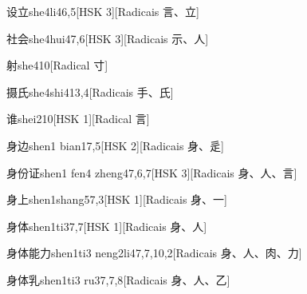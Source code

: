 \begin{entry}{设立}{she4li4}{6,5}[HSK 3][Radicais ⾔、⽴]
\end{entry}

\begin{entry}{社会}{she4hui4}{7,6}[HSK 3][Radicais ⽰、⼈]
\end{entry}

\begin{entry}{射}{she4}{10}[Radical ⼨]
\end{entry}

\begin{entry}{摄氏}{she4shi4}{13,4}[Radicais ⼿、⽒]
\end{entry}

\begin{entry}{谁}{shei2}{10}[HSK 1][Radical ⾔]
\end{entry}

\begin{entry}{身边}{shen1 bian1}{7,5}[HSK 2][Radicais ⾝、⾡]
\end{entry}

\begin{entry}{身份证}{shen1 fen4 zheng4}{7,6,7}[HSK 3][Radicais ⾝、⼈、⾔]
\end{entry}

\begin{entry}{身上}{shen1shang5}{7,3}[HSK 1][Radicais ⾝、⼀]
\end{entry}

\begin{entry}{身体}{shen1ti3}{7,7}[HSK 1][Radicais ⾝、⼈]
\end{entry}

\begin{entry}{身体能力}{shen1ti3 neng2li4}{7,7,10,2}[Radicais ⾝、⼈、⾁、⼒]
\end{entry}

\begin{entry}{身体乳}{shen1ti3 ru3}{7,7,8}[Radicais ⾝、⼈、⼄]
\end{entry}

